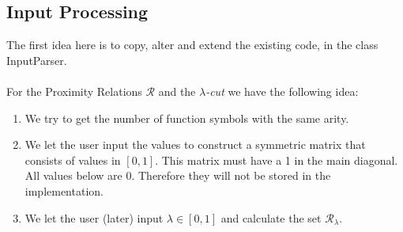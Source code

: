 \documentclass{article}
\begin{document}

\subsection{Input Processing} 

The first idea here is to copy, alter and extend the existing code, in the class InputParser.
\\ \ \\
\noindent
For the Proximity Relations \(\mathcal{R}\) and the \(\lambda\)\textit{-cut} we have the following idea:\\
\begin{enumerate}
	\item We try to get the number of function symbols with the same arity. 
	\item We let the user input the values to construct a symmetric matrix that consists of values in \([0,1]\). This matrix must have a 1 in the main diagonal. All values below are 0. Therefore they will not be stored in the implementation.
	\item We let the user (later) input \(\lambda\in[0,1]\) and calculate the set \(\mathcal{R}_\lambda\).
\end{enumerate}
\end{document}

